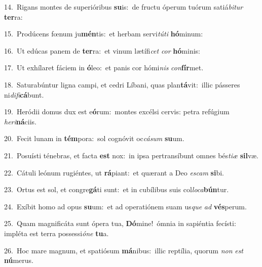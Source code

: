 {\numbfont\textcolor{\numbcolor}{14.}}~Rigans montes de superióribus \textbf{su}\-is:~\star de fructu óperum tuórum satiá\-\textit{bi}\-\textit{tur} \textbf{ter}\-ra:\par
{\numbfont\textcolor{\numbcolor}{15.}}~Prodúcens fœnum ju\-\textbf{mén}\-tis:~\star et herbam servi\-\textit{tú}\-\textit{ti} \textbf{hó}\-minum:\par
{\numbfont\textcolor{\numbcolor}{16.}}~Ut edúcas panem de \textbf{ter}\-ra:~\star et vinum lætífi\textit{cet} \textit{cor} \textbf{hó}\-minis:\par
{\numbfont\textcolor{\numbcolor}{17.}}~Ut exhílaret fáciem in \textbf{ó}\-leo:~\star et panis cor hómi\textit{nis} \textit{con}\-\textbf{fír}met.\par
{\numbfont\textcolor{\numbcolor}{18.}}~Saturabúntur ligna campi, et cedri Líbani, quas plan\-\textbf{tá}\-vit:~\star illic pásseres ni\-\textit{di}\-\textit{fi}\textbf{cá}bunt.\par
{\numbfont\textcolor{\numbcolor}{19.}}~Heródii domus dux est e\-\textbf{ó}\-rum:~\star montes excélsi cervis: petra refúgium \textit{he}\-\textit{ri}\textbf{ná}ciis.\par
{\numbfont\textcolor{\numbcolor}{20.}}~Fecit lunam in \textbf{tém}\-pora:~\star sol cognóvit oc\-\textit{cá}\-\textit{sum} \textbf{su}\-um.\par
{\numbfont\textcolor{\numbcolor}{21.}}~Posuísti ténebras, et facta \textbf{est} nox:~\star in ipsa pertransíbunt omnes bés\-\textit{ti}\-\textit{æ} \textbf{sil}\-væ.\par
{\numbfont\textcolor{\numbcolor}{22.}}~Cátuli leónum rugiéntes, ut \textbf{rá}\-piant:~\star et quærant a Deo \textit{es}\-\textit{cam} \textbf{si}\-bi.\par
{\numbfont\textcolor{\numbcolor}{23.}}~Ortus est sol, et congre\-\textbf{gá}\-ti sunt:~\star et in cubílibus suis col\-\textit{lo}\-\textit{ca}\textbf{bún}tur.\par
{\numbfont\textcolor{\numbcolor}{24.}}~Exíbit homo ad opus \textbf{su}\-um:~\star et ad operatiónem suam us\textit{que} \textit{ad} \textbf{vés}\-perum.\par
{\numbfont\textcolor{\numbcolor}{25.}}~Quam magnificáta sunt ópera tua, \textbf{Dó}\-mine!~\star ómnia in sapiéntia fecísti: impléta est terra possessi\-\textit{ó}\-\textit{ne} \textbf{tu}\-a.\par
{\numbfont\textcolor{\numbcolor}{26.}}~Hoc mare magnum, et spatiósum \textbf{má}\-nibus:~\star illic reptília, quorum \textit{non} \textit{est} \textbf{nú}\-merus.\par
